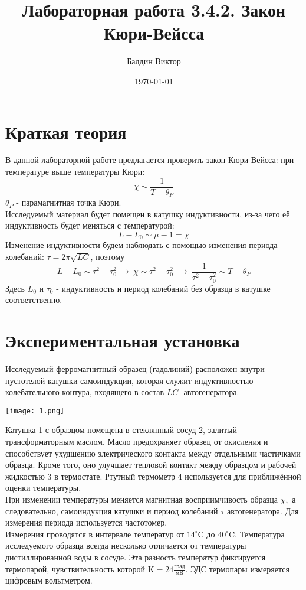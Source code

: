\documentclass[a4paper, 12pt]{article}
\title{Лабораторная работа 3.4.2. Закон Кюри-Вейсса}
\author{Балдин Виктор}
\date{\today}
\begin{document}
	\maketitle

	\section*{Краткая теория}
	В данной лабораторной работе предлагается проверить закон Кюри-Вейсса: при температуре выше температуры Кюри:
	\[\chi \sim \frac{1}{T - \theta_P}\]
	$\theta_P$ - парамагнитная точка Кюри.\\
	Исследуемый материал будет помещен в катушку индуктивности, из-за чего её индуктивность будет меняться с температурой:
	\[L - L_0 \sim \mu - 1 = \chi\]
	Изменение индуктивности будем наблюдать с помощью изменения периода колебаний: $\tau = 2\pi\sqrt{LC}$, поэтому
	\[L - L_0 \sim \tau^2 - \tau_0^2 \ \rightarrow \ \chi \sim \tau^2 - \tau_0^2 \ \ \rightarrow \ \frac{1}{\tau^2 - \tau_0^2} \sim T - \theta_P\]
	Здесь $L_0$ и $\tau_0$ - индуктивность и период колебаний без образца в катушке соответственно.
	\section*{Экспериментальная установка}

	Исследуемый ферромагнитный образец (гадолиний) расположен внутри пустотелой катушки самоиндукции, которая служит индуктивностью колебательного контура, входящего в состав $L C$ -автогенератора.

	\begin{center}
		\texttt{[image: 1.png]}
		\label{pic1}
	\end{center}
	Катушка 1 с образцом помещена в стеклянный сосуд 2, залитый трансформаторным маслом. Масло предохраняет образец от окисления и способствует ухудшению электрического контакта между отдельными частичками образца. Кроме того, оно улучшает тепловой контакт между образцом и рабочей жидкостью 3 в термостате. Ртутный термометр 4 используется для приближённой оценки температуры.\\
	При изменении температуры меняется магнитная восприимчивость образца $\chi,$ а следовательно, самоиндукция катушки и период колебаний $\tau$ автогенератора. Для измерения периода используется частотомер. \\
	Измерения проводятся в интервале температур от $14^{\circ} \mathrm{C}$ до $40^{\circ} \mathrm{C} .$
	Температура исследуемого образца всегда несколько отличается от температуры дистиллированной воды в сосуде. Эта разность температур фиксируется термопарой, чувствительность которой $\mathrm{K}=24\frac{\text{град}}{\text{мВ}}$. ЭДС термопары измеряется цифровым вольтметром.
\end{document}
